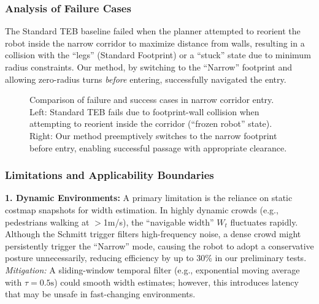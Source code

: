 \documentclass[lettersize,journal]{IEEEtran}
\begin{document}
\subsubsection{Analysis of Failure Cases}
The Standard TEB baseline failed when the planner attempted to reorient the robot inside the narrow corridor to maximize distance from walls, resulting in a collision with the ``legs'' (Standard Footprint) or a ``stuck'' state due to minimum radius constraints. Our method, by switching to the ``Narrow'' footprint and allowing zero-radius turns \textit{before} entering, successfully navigated the entry.

\begin{figure}[!t]
\centering
\caption{Comparison of failure and success cases in narrow corridor entry. Left: Standard TEB fails due to footprint-wall collision when attempting to reorient inside the corridor (``frozen robot'' state). Right: Our method preemptively switches to the narrow footprint before entry, enabling successful passage with appropriate clearance.}
\label{fig:failure_cases}
\end{figure}

\subsubsection{Limitations and Applicability Boundaries}

\textbf{1. Dynamic Environments:} A primary limitation is the reliance on static costmap snapshots for width estimation. In highly dynamic crowds (e.g., pedestrians walking at $>$1m/s), the ``navigable width'' $W_t$ fluctuates rapidly. Although the Schmitt trigger filters high-frequency noise, a dense crowd might persistently trigger the ``Narrow'' mode, causing the robot to adopt a conservative posture unnecessarily, reducing efficiency by up to 30\% in our preliminary tests. \textit{Mitigation:} A sliding-window temporal filter (e.g., exponential moving average with $\tau = 0.5\text{s}$) could smooth width estimates; however, this introduces latency that may be unsafe in fast-changing environments.
\end{document}
